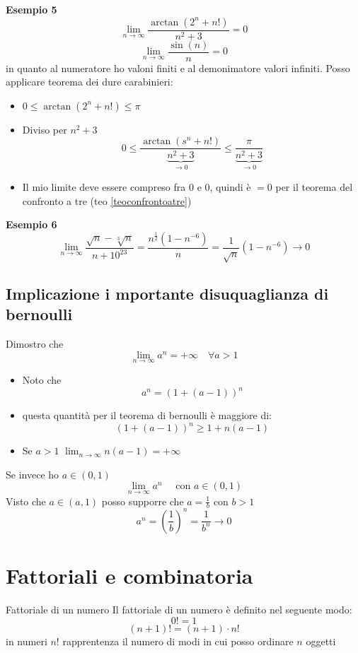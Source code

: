 \textbf{Esempio 5}
\[
	\lim_{n \to \infty} \frac{\arctan \left( 2^{n} + n! \right) }{n^2 + 3} = 0
\]
\[
	\lim_{n \to \infty} \frac{\sin\left( n \right)}{n}  = 0
\]
in quanto al numeratore ho valoni finiti e al demonimatore valori infiniti. Posso applicare teorema dei dure carabinieri:
\begin{itemize}
	\item $0 \le \arctan \left( 2^{n} + n! \right) \le \pi$
	\item Diviso per $ n^2 + 3$
	      \[
		      0 \le \frac{\arctan \left( s^{n} + n! \right) } {\underbrace{n^2 + 3}_{\to 0}} \le \frac{\pi}{\underbrace{n^2 + 3}_{\to 0}}
	      \]
	\item Il mio limite deve essere compreso fra $0$ e $0$, quindi è $=0$ per il teorema del confronto a tre (teo \ref{teoconfrontoatre})
\end{itemize}
\textbf{Esempio 6}
\[
	\lim_{n \to \infty} \frac{\sqrt{n} - \sqrt[3] {n} }{n + 10^{23}} = \frac{n^{\frac{1}{2}}\left( 1- n^{-6} \right)}{n}  = \frac{1}{\sqrt{n} }\left( 1-n^{-6} \right) \to 0
\]
\subsection{Implicazione i mportante disuquaglianza di bernoulli}
Dimostro che
\[
	\lim_{n \to \infty} a ^{ n} = + \infty \quad \forall a > 1
\]
\begin{itemize}
	\item Noto che
	      \[
		      a^{n}= \left( 1 + \left(  a-1 \right)  \right) ^{n}
	      \]
	\item questa quantità per il teorema di bernoulli è maggiore di:
	      \[
		      \left( 1 + \left( a-1 \right)  \right) ^{n} \ge 1 + n\left( a-1 \right)
	      \]
	\item Se $a > 1$ $\lim_{n \to \infty} n\left( a-1 \right) = + \infty $
\end{itemize}
Se invece ho $a \in  \left( 0,1 \right) $
\[
	\lim_{n \to \infty} a^{n} \quad \text{  con  }a \in  \left( 0,1 \right)
\]
Visto che $a \in  \left( a,1 \right) $ posso supporre che $a=\frac{1}{b}$ con $b > 1$
\[
	a^{n} = \left( \frac{1}{b} \right) ^{n} = \frac{1}{b^{n}} \to 0
\]
\section{Fattoriali e combinatoria}
\begin{definizione}{Fattoriale di un numero}
	Il fattoriale di un numero è definito nel seguente modo:
	\[
		0! = 1
	\]
	\[
		\left( n+1 \right) ! = \left( n+1 \right) \cdot n!
	\]
	in numeri $ n!$ rapprentenza il numero di modi in cui posso ordinare $n$ oggetti

\end{definizione}

